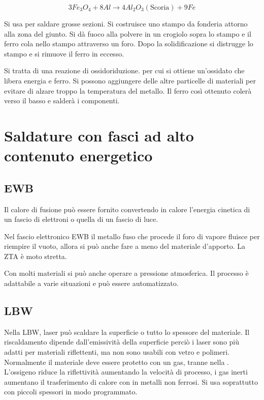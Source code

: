 \begin{equation}
3Fe_3O_4 + 8Al \rightarrow 4Al_2O_3 (\text{Scoria}) + 9Fe
\end{equation}

Si usa per saldare grosse sezioni. Si costruisce uno stampo da fonderia attorno alla zona del giunto.
Si dà fuoco alla polvere in un crogiolo sopra lo stampo e il ferro cola nello stampo attraverso un foro.
Dopo la solidificazione si distrugge lo stampo e si rimuove il ferro in eccesso.

Si tratta di una reazione di ossidoriduzione. per cui si ottiene un'ossidato che libera energia e ferro. Si possono aggiungere delle altre particelle di materiali per evitare di alzare troppo la temperatura del metallo.
Il ferro così ottenuto colerà verso il basso e salderà i componenti.

\section{Saldature con fasci ad alto contenuto energetico}
\subsection{\ac{EWB}}
Il calore di fusione può essere fornito convertendo in calore l'energia cinetica di un fascio di elettroni o quella di un fascio di luce.

Nel fascio elettronico \ac{EWB} il metallo fuso che procede il foro di vapore fluisce per riempire il vuoto, allora si può anche fare a meno del materiale d'apporto.
La \ac{ZTA} è moto stretta.

Con molti materiali si può anche operare a pressione atmosferica.
Il processo è adattabile a varie situazioni e può essere automatizzato.

\subsection{\ac{LBW}}
Nella \ac{LBW}, laser può scaldare la superficie o tutto lo spessore del materiale.
Il riscaldamento dipende dall'emissività della superficie perciò i laser  sono più adatti per materiali riflettenti, ma non sono usabili con vetro e polimeri.
Normalmente il materiale deve essere protetto con un gas, tranne nella .
L'ossigeno riduce la riflettività aumentando la velocità di processo, i gas inerti aumentano il trasferimento di calore con in metalli non ferrosi.
Si usa soprattutto con piccoli spessori in modo programmato.

